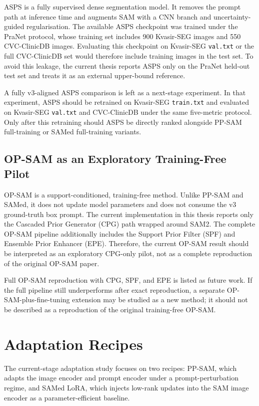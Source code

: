 ASPS is a fully supervised dense segmentation model. It removes the prompt path at inference time and augments SAM with a CNN branch and uncertainty-guided regularisation. The available ASPS checkpoint was trained under the PraNet protocol, whose training set includes 900 Kvasir-SEG images and 550 CVC-ClinicDB images. Evaluating this checkpoint on Kvasir-SEG \texttt{val.txt} or the full CVC-ClinicDB set would therefore include training images in the test set. To avoid this leakage, the current thesis reports ASPS only on the PraNet held-out test set and treats it as an external upper-bound reference.

A fully v3-aligned ASPS comparison is left as a next-stage experiment. In that experiment, ASPS should be retrained on Kvasir-SEG \texttt{train.txt} and evaluated on Kvasir-SEG \texttt{val.txt} and CVC-ClinicDB under the same five-metric protocol. Only after this retraining should ASPS be directly ranked alongside PP-SAM full-training or SAMed full-training variants.

\subsection{OP-SAM as an Exploratory Training-Free Pilot}
\label{sec:opsam-caveat}

OP-SAM is a support-conditioned, training-free method. Unlike PP-SAM and SAMed, it does not update model parameters and does not consume the v3 ground-truth box prompt. The current implementation in this thesis reports only the Cascaded Prior Generator (CPG) path wrapped around SAM2. The complete OP-SAM pipeline additionally includes the Support Prior Filter (SPF) and Ensemble Prior Enhancer (EPE). Therefore, the current OP-SAM result should be interpreted as an exploratory CPG-only pilot, not as a complete reproduction of the original OP-SAM paper.

Full OP-SAM reproduction with CPG, SPF, and EPE is listed as future work. If the full pipeline still underperforms after exact reproduction, a separate OP-SAM-plus-fine-tuning extension may be studied as a new method; it should not be described as a reproduction of the original training-free OP-SAM.

\section{Adaptation Recipes}
\label{sec:adaptation-recipes}

The current-stage adaptation study focuses on two recipes: PP-SAM, which adapts the image encoder and prompt encoder under a prompt-perturbation regime, and SAMed LoRA, which injects low-rank updates into the SAM image encoder as a parameter-efficient baseline.

